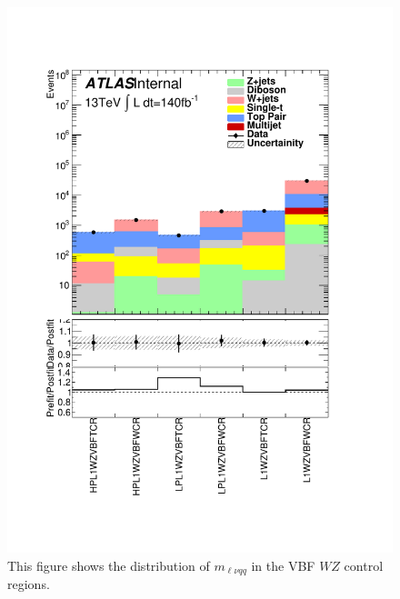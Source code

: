 \begin{figure}[h!]
  \centering
  \includegraphics[width=\hsize]{figures/results/HVTWZVBF/PlotyieldTable_postfit.pdf}
 \caption{This figure shows the distribution of $m_{\ell\nu qq}$ in the VBF $WZ$ control regions.} 
  \label{fig:hvtwzvbf_cr_postfit}
\end{figure} 
\FloatBarrier



